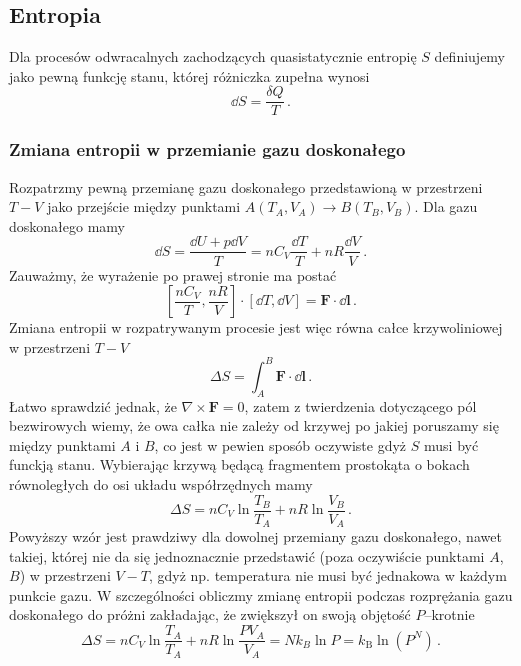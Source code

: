 \documentclass[../main.tex]{subfiles}
\begin{document}
\subsection{Entropia}
Dla procesów odwracalnych zachodzących quasistatycznie entropię \(S\) definiujemy jako pewną funkcję
stanu, której różniczka zupełna wynosi
\begin{equation*}
    \dd{S}=\frac{\delta Q}{T}\,.
\end{equation*}
\subsubsection{Zmiana entropii w przemianie gazu doskonałego}
Rozpatrzmy pewną przemianę gazu doskonałego przedstawioną w przestrzeni \(T-V\) jako przejście
między punktami \(A(T_A,V_A)\to B(T_B,V_B)\). Dla gazu doskonałego mamy
\begin{equation*}
    \dd{S}=\frac{\dd{U+p\dd{V}}}{T}=nC_V\frac{\dd{T}}{T}+nR\frac{\dd{V}}{V}\,.
\end{equation*}
Zauważmy, że wyrażenie po prawej stronie ma postać
\begin{equation*}
    \left[\frac{nC_V}{T},\frac{nR}{V}\right]\cdot\left[\dd{T},\dd{V}\right]=\mathbf{F}\cdot \dd{\mathbf{l}}\,.
\end{equation*}
Zmiana entropii w rozpatrywanym procesie jest więc równa całce krzywoliniowej w przestrzeni \(T-V\)
\begin{equation*}
    \Delta S=\int_A^B\mathbf{F}\cdot \dd{\mathbf{l}}\,.
\end{equation*}
Łatwo sprawdzić jednak, że \(\nabla\times\mathbf{F}=0\), zatem z twierdzenia dotyczącego pól
bezwirowych wiemy, że owa całka nie zależy od krzywej po jakiej poruszamy się między punktami \(A\)
i \(B\), co jest w pewien sposób oczywiste gdyż \(S\) musi być funckją stanu. Wybierając krzywą
będącą fragmentem prostokąta o bokach równoległych do osi układu współrzędnych mamy
\begin{equation*}
    \Delta S=nC_V\ln\frac{T_B}{T_A}+nR\ln\frac{V_B}{V_A}\,.
\end{equation*}
Powyższy wzór jest prawdziwy dla dowolnej przemiany gazu doskonałego, nawet takiej, której nie da
się jednoznacznie przedstawić (poza oczywiście punktami \(A\), \(B\)) w przestrzeni \(V-T\), gdyż
np. temperatura nie musi być jednakowa w każdym punkcie gazu. W szczególności obliczmy zmianę
entropii podczas rozprężania gazu doskonałego do próżni zakładając, że zwiększył on swoją objętość
\(P\)--krotnie
\begin{equation*}
    \Delta S=nC_V\ln\frac{T_A}{T_A}+nR\ln\frac{PV_A}{V_A}=Nk_B\ln P=k_\text{B}\ln({P^N})\,.
\end{equation*}
\end{document}
